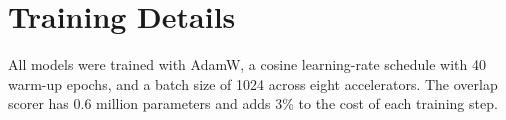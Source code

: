 \chapter{Training Details}
\label{app:a}

All models were trained with AdamW, a cosine learning-rate schedule with 40 warm-up epochs,
and a batch size of 1024 across eight accelerators. The overlap scorer has 0.6 million
parameters and adds 3\% to the cost of each training step.
